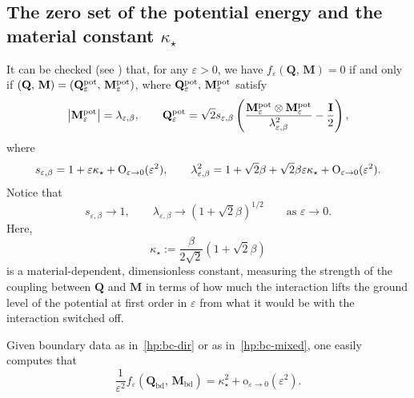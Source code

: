 \documentclass[a4paper, 11pt, twoside, leqno]{article}
\theoremstyle{definition}              %
\theoremstyle{remark}                  %
\newcommand{\abs}[1]{\left| #1 \right|}                             %
\renewcommand{\o}{\mathrm{o}}
\newcommand{\Q}{\mathbf{Q}}
\newcommand{\M}{\mathbf{M}}
\newcommand{\I}{\mathbf{I}}
\newcommand{\eps}{\varepsilon}
\newcommand{\Qb}{\Q_{\mathrm{bd}}}
\newcommand{\Mb}{\M_{\mathrm{bd}}}
\begin{document}
\subsection{The zero set of the potential energy and the material constant $\kappa_\star$}

It can be checked (see \cite[Lemma~B.2]{CMSW}) that,  
for any $\eps > 0$, we have $f_\eps(\Q,\,\M) = 0$ if and only 
if $(\Q,\,\M) = (\Q^{\rm pot}_\eps,\,\M^{\rm pot}_\eps)$, where 
$\Q^{\rm pot}_\eps,\,\M^{\rm pot}_\eps$ satisfy   
\[
	\abs{\M^{\rm pot}_\eps} = \lambda_{\eps,\beta},  \qquad 
	\Q^{\rm pot}_\eps = \sqrt{2} s_{\eps,\beta}\left( \frac{\M^{\rm pot}_\eps \otimes \M^{\rm pot}_\eps}{\lambda_{\eps,\beta}^2} - \frac{\I}{2} \right), 
\]
where
\[
	s_{\eps,\beta} = 1 + \eps \kappa_\star + {\rm O}_{\eps \to 0}(\eps^2), 
	\qquad 
	\lambda_{\eps,\beta}^2 = 1 + \sqrt{2}\beta + \sqrt{2}\beta \eps \kappa_\star + {\rm O}_{\eps \to 0}(\eps^2). 
\]
Notice that
\[
	s_{\eps,\beta} \to 1, \qquad 
	\lambda_{\eps,\beta} \to \left( 1 + \sqrt{2}\beta \right)^{1/2} 
	\qquad \mbox{as } \eps \to 0. 
\]
Here, 
\begin{equation}\label{eq:kappa*}
	\kappa_\star := \frac{\beta}{2\sqrt{2}}\left( 1 + \sqrt{2}\beta \right)
\end{equation}
is a material-dependent, dimensionless constant, measuring the strength of the coupling 
between $\Q$ and $\M$ in terms of how much the interaction lifts the ground level 
of the potential at first order in $\eps$ from what it would be with the interaction  switched off.

Given boundary data as in~\eqref{hp:bc-dir} or as in~\eqref{hp:bc-mixed}, 
one easily computes that
\[
	\frac{1}{\eps^2}f_\eps(\Qb,\,\Mb) 
	= \kappa_\star^2 + \o_{\eps \to 0}(\eps^2).
\]


\end{document}
